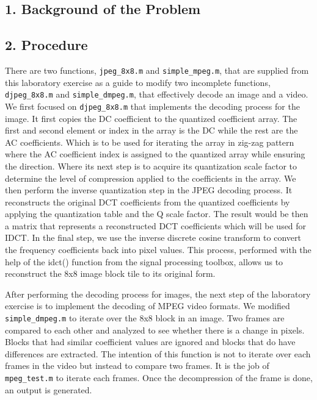 \documentclass{article}
\begin{document}
	\subsection*{1. Background of the Problem}


	\subsection*{2. Procedure}
	There are two functions, {\texttt{jpeg\_8x8.m}} and {\texttt{simple\_mpeg.m}}, that are supplied from this laboratory exercise as a guide to modify two incomplete functions, 
	{\texttt{djpeg\_8x8.m}} and {\texttt{simple\_dmpeg.m}}, that effectively decode an image and a video. We first focused on {\texttt{djpeg\_8x8.m}} that implements the decoding 
	process for the image. It first copies the DC coefficient to the quantized coefficient array. The first and second element or index in the array is the DC while the rest 
	are the AC coefficients. Which is to be used for iterating the array in zig-zag pattern where the AC coefficient index is assigned to the quantized array while ensuring 
	the direction. Where its next step is to acquire its quantization scale factor to determine the level of compression applied to the coefficients in the array. We then 
	perform the inverse quantization step in the JPEG decoding process. It reconstructs the original DCT coefficients from the quantized coefficients by applying the 
	quantization table and the Q scale factor. The result would be then a matrix that represents a reconstructed DCT coefficients which will be used for IDCT. In the final step, 
	we use the inverse discrete cosine transform to convert the frequency coefficients back into pixel values. This process, performed with the help of the idct() function from the 
	signal processing toolbox, allows us to reconstruct the 8x8 image block tile to its original form.

	After performing the decoding process for images, the next step of the laboratory exercise is to implement the decoding of MPEG video formats. We modified {\texttt{simple\_dmpeg.m}}
	to iterate over the 8x8 block in an image. Two frames are compared to each other and analyzed to see whether there is a change in pixels. Blocks that had similar coefficient values
	are ignored and blocks that do have differences are extracted. The intention of this function is not to iterate over each frames in the video but instead to compare two frames. 
	It is the job of {\texttt{mpeg\_test.m}} to iterate each frames. Once the decompression of the frame is done, an output is generated.
\end{document}
